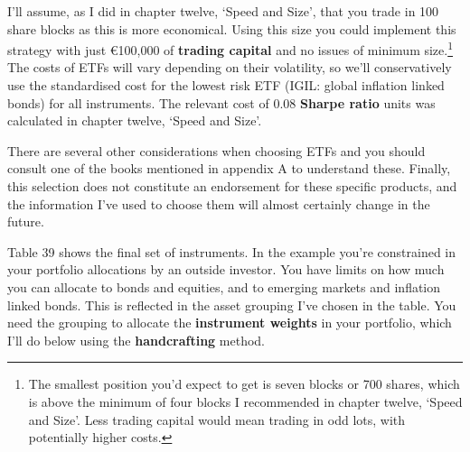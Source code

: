 I'll assume, as I did in chapter twelve, ‘Speed and Size', that you trade in 100 share blocks as this is more economical. Using this size you could implement this strategy with just €100,000 of \textbf{trading capital} and no issues of minimum size.\footnote{The smallest position you’d expect to get is seven blocks or 700 shares, which is above the minimum of four blocks I recommended in chapter twelve, ‘Speed and Size’. Less trading capital would mean trading in odd lots, with potentially higher costs.}
The costs of ETFs will vary depending on their volatility, so we'll conservatively use the standardised cost for the lowest risk ETF (IGIL: global inflation linked bonds) for all instruments. The relevant cost of 0.08 \textbf{Sharpe ratio} units was calculated in chapter twelve, ‘Speed and Size'.

There are several other considerations when choosing ETFs and you should consult one of the books mentioned in appendix A to understand these. Finally, this selection does not constitute an endorsement for these specific products, and the information I've used to choose them will almost certainly change in the future.

Table 39 shows the final set of instruments. In the example you're constrained in your portfolio allocations by an outside investor. You have limits on how much you can allocate to bonds and equities, and to emerging markets and inflation linked bonds. This is reflected in the asset grouping I've chosen in the table. You need the grouping to allocate the \textbf{instrument weights} in your portfolio, which I'll do below using the \textbf{handcrafting} method.


